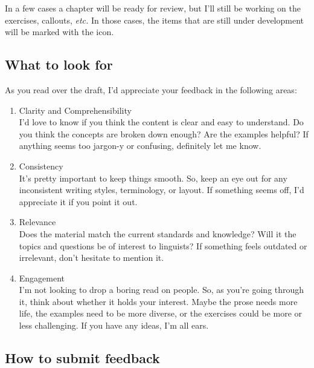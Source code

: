 \documentclass[
  letterpaper,
  DIV=11,
  numbers=noendperiod]{scrreport}
\theoremstyle{definition}
\theoremstyle{remark}
\begin{document}
In a few cases a chapter will be ready for review, but I'll still be
working on the exercises, callouts, \emph{etc.} In those cases, the
items that are still under development will be marked with the
 icon.

\hypertarget{what-to-look-for}{%
\subsection*{What to look for}\label{what-to-look-for}}

As you read over the draft, I'd appreciate your feedback in the
following areas:

\begin{enumerate}
\def\labelenumi{\arabic{enumi}.}
\item
  Clarity and Comprehensibility\\
  I'd love to know if you think the content is clear and easy to
  understand. Do you think the concepts are broken down enough? Are the
  examples helpful? If anything seems too jargon-y or confusing,
  definitely let me know.
\item
  Consistency\\
  It's pretty important to keep things smooth. So, keep an eye out for
  any inconsistent writing styles, terminology, or layout. If something
  seems off, I'd appreciate it if you point it out.
\item
  Relevance\\
  Does the material match the current standards and knowledge? Will it
  the topics and questions be of interest to linguists? If something
  feels outdated or irrelevant, don't hesitate to mention it.
\item
  Engagement\\
  \hspace{0pt}I\hspace{0pt}'m not looking to drop a boring read on
  people. So, as you're going through it, think about whether it holds
  your interest. Maybe \hspace{0pt}the prose needs more life, the
  examples need to be more diverse, or the exercises could be more or
  less challenging. If you have any ideas, I'm all ears.
\end{enumerate}

\hypertarget{how-to-submit-feedback}{%
\subsection*{How to submit feedback}\label{how-to-submit-feedback}}
\end{document}
